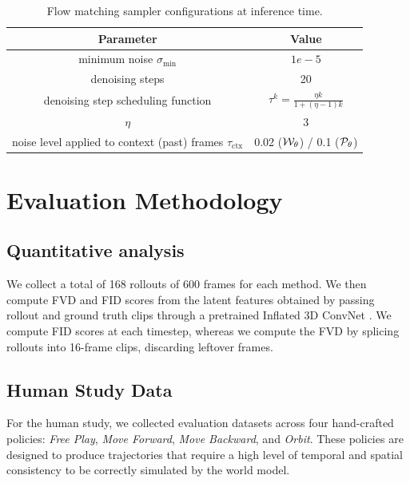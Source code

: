 \documentclass{article}
\theoremstyle{plain}
\theoremstyle{definition}
\theoremstyle{remark}
\begin{document}
\begin{table}[]
\begin{minipage}[t]{0.48\textwidth}
\vspace{0.8em}

\caption{Flow matching sampler configurations at inference time.}
\label{table:samplers}
\begin{tabular}{cc}\toprule
Parameter & Value \\
\midrule
minimum noise $\sigma_\text{min}$ & $1e-5$ \\
denoising steps & 20 \\
denoising step scheduling function & $\tau^k = \frac{\eta k}{1 + (\eta-1)k}$ \\
$\eta$ & 3 \\
noise level applied to context (past) frames $\tau_\text{ctx}$ & 0.02 (${\mathcal{W}}_\theta$) / 0.1 (${\mathcal{P}}_\theta$) \\
\bottomrule
\end{tabular}

\end{minipage}

\end{table}




\section{Evaluation Methodology}\label{app:data_met}


\subsection{Quantitative analysis}

We collect a total of 168 rollouts of 600 frames for each method. We then compute FVD and FID scores from the latent features obtained by passing rollout and ground truth clips through a pretrained Inflated 3D ConvNet \citep{carreira2017quo}. We compute FID scores at each timestep, whereas we compute the FVD by splicing rollouts into 16-frame clips, discarding leftover frames.

\subsection{Human Study Data}

For the human study, we collected evaluation datasets across four hand-crafted policies: \textit{Free Play}, \textit{Move Forward}, \textit{Move Backward}, and \textit{Orbit}.
These policies are designed to produce trajectories that require a high level of temporal and spatial consistency to be correctly simulated by the world model.
\end{document}

